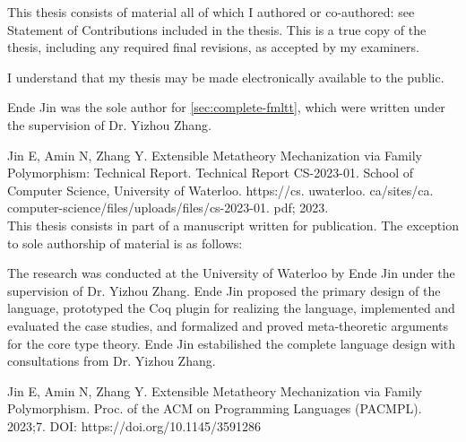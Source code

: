 





\newpage
{}
\setcounter{page}{2}

\vspace*{\fill}


This thesis consists of material all of which I authored or co-authored: see Statement of Contributions included in the thesis. This is a true copy of the thesis, including any required final revisions, as accepted by my examiners.

I understand that my thesis may be made electronically available to the public.

\vspace*{\fill}

\newpage 


\vspace*{\fill}




Ende Jin was the sole author for \cref{sec:complete-fmltt}, which were written under the supervision of Dr. Yizhou Zhang.


Jin E, Amin N, Zhang Y. Extensible Metatheory Mechanization via Family Polymorphism: Technical Report. Technical Report CS-2023-01. School of Computer Science, University of Waterloo. https://cs. uwaterloo. ca/sites/ca. computer-science/files/uploads/files/cs-2023-01. pdf; 2023. \\


This thesis consists in part of a manuscript written for publication. The exception to sole authorship of material is as follows: 

The research was conducted at the University of Waterloo by Ende Jin under the supervision of Dr. Yizhou Zhang. Ende Jin proposed the primary design of the language, prototyped the Coq plugin for realizing the language, implemented and evaluated the case studies, and formalized and proved meta-theoretic arguments for the core type theory. Ende Jin estabilished the complete language design with consultations from Dr. Yizhou Zhang.


Jin E, Amin N, Zhang Y. Extensible Metatheory Mechanization via Family Polymorphism. Proc. of the ACM on Programming Languages (PACMPL). 2023;7. DOI: https://doi.org/10.1145/3591286


